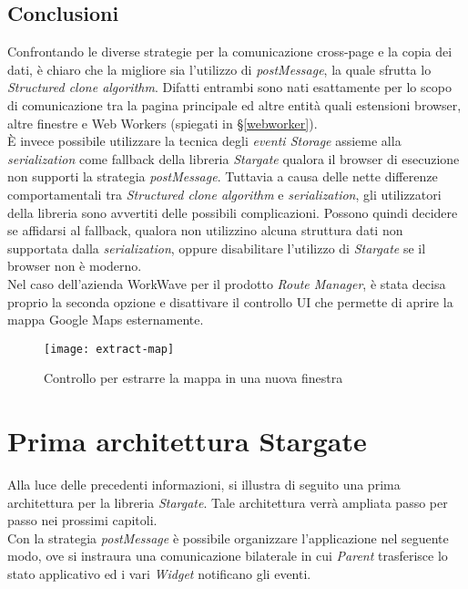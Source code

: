 \subsection{Conclusioni}

Confrontando le diverse strategie per la comunicazione cross-page e la copia dei dati, è chiaro che la migliore sia l'utilizzo di \textit{postMessage}, la quale sfrutta lo \textit{Structured clone algorithm}. Difatti entrambi sono nati esattamente per lo scopo di comunicazione tra la pagina principale ed altre entità quali estensioni browser, altre finestre e Web Workers (spiegati in §\ref{webworker}).\\

È invece possibile utilizzare la tecnica degli \textit{eventi Storage} assieme alla \textit{serialization} come fallback della libreria \textit{Stargate} qualora il browser di esecuzione non supporti la strategia \textit{postMessage}. Tuttavia a causa delle nette differenze comportamentali tra \textit{Structured clone algorithm} e \textit{serialization}, gli utilizzatori della libreria sono avvertiti delle possibili complicazioni. Possono quindi decidere se affidarsi al fallback, qualora non utilizzino alcuna struttura dati non supportata dalla \textit{serialization}, oppure disabilitare l'utilizzo di \textit{Stargate} se il browser non è moderno.\\

Nel caso dell'azienda WorkWave per il prodotto \textit{Route Manager}, è stata decisa proprio la seconda opzione e disattivare il controllo UI che permette di aprire la mappa Google Maps esternamente.

\begin{figure}[H] 
    \centering 
    \texttt{[image: extract-map]} 
    \caption{Controllo per estrarre la mappa in una nuova finestra}
\end{figure}

\section{Prima architettura Stargate}

Alla luce delle precedenti informazioni, si illustra di seguito una prima architettura per la libreria \textit{Stargate}. Tale architettura verrà ampliata passo per passo nei prossimi capitoli. \\

Con la strategia \textit{postMessage} è possibile organizzare l'applicazione nel seguente modo, ove si instraura una comunicazione bilaterale in cui \textit{Parent} trasferisce lo stato applicativo ed i vari \textit{Widget} notificano gli eventi. \\

